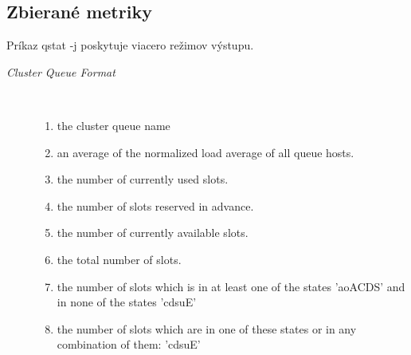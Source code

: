 \documentclass[11pt,final,oneside]{fithesis}
\begin{document}
\subsection{Zbierané metriky}
Príkaz qstat -j poskytuje viacero režimov výstupu.
\begin{description}
\item[\emph{Cluster Queue Format}]
\\
\begin{enumerate}
\item[] the cluster queue name
\item[] an average of the normalized load average  of  all  queue
        hosts.
\item[] the number of currently used slots.
\item[] the number of slots reserved in advance.
\item[] the number of currently available slots.
\item[] the total number of slots.
\item[] the number of slots which is  in  at  least  one  of  the states  'aoACDS' and in none of the states 'cdsuE'
\item[] the number of slots which are in one of these  states  or in any  combination of them: 'cdsuE'
\end{enumerate}


\end{description}
\end{document}
